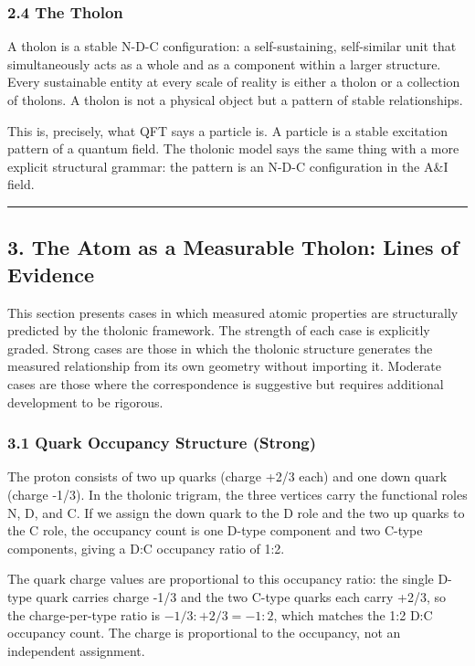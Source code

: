 \documentclass[
  11pt,
  letterpaper,
]{article}
\begin{document}
\subsubsection{2.4 The Tholon}\label{the-tholon}

A tholon is a stable N-D-C configuration: a self-sustaining,
self-similar unit that simultaneously acts as a whole and as a component
within a larger structure. Every sustainable entity at every scale of
reality is either a tholon or a collection of tholons. A tholon is not a
physical object but a pattern of stable relationships.

This is, precisely, what QFT says a particle is. A particle is a stable
excitation pattern of a quantum field. The tholonic model says the same
thing with a more explicit structural grammar: the pattern is an N-D-C
configuration in the A\&I field.

\begin{center}\rule{0.5\linewidth}{0.5pt}\end{center}

\subsection{3. The Atom as a Measurable Tholon: Lines of
Evidence}\label{the-atom-as-a-measurable-tholon-lines-of-evidence}

This section presents cases in which measured atomic properties are
structurally predicted by the tholonic framework. The strength of each
case is explicitly graded. Strong cases are those in which the tholonic
structure generates the measured relationship from its own geometry
without importing it. Moderate cases are those where the correspondence
is suggestive but requires additional development to be rigorous.

\subsubsection{3.1 Quark Occupancy Structure
(Strong)}\label{quark-occupancy-structure-strong}

The proton consists of two up quarks (charge +2/3 each) and one down
quark (charge -1/3). In the tholonic trigram, the three vertices carry
the functional roles N, D, and C. If we assign the down quark to the D
role and the two up quarks to the C role, the occupancy count is one
D-type component and two C-type components, giving a D:C occupancy ratio
of 1:2.

The quark charge values are proportional to this occupancy ratio: the
single D-type quark carries charge -1/3 and the two C-type quarks each
carry +2/3, so the charge-per-type ratio is \(-1/3 : +2/3 = -1:2\),
which matches the 1:2 D:C occupancy count. The charge is proportional to
the occupancy, not an independent assignment.
\end{document}
